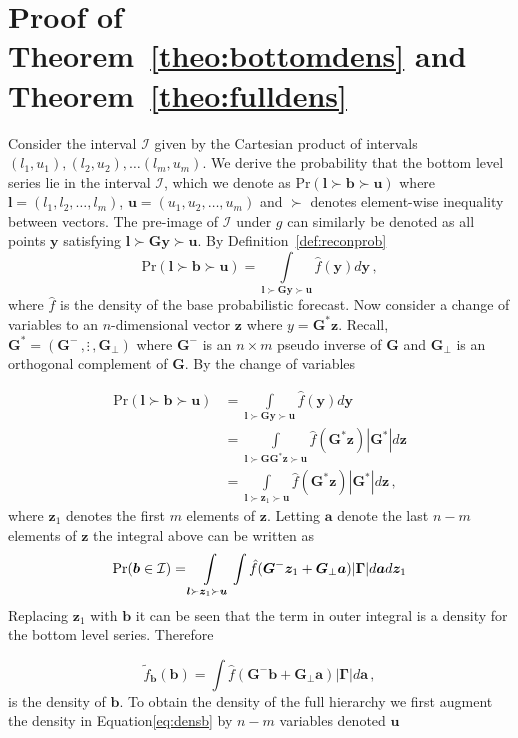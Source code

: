 \documentclass[12pt]{article}
\theoremstyle{definition}
\begin{document}
\newpage

\appendix

\section{Proof of Theorem~\ref{theo:bottomdens} and Theorem~\ref{theo:fulldens}}

Consider the interval $\mathcal{I}$ given by the Cartesian product of intervals $(l_1,u_1),(l_2,u_2),\ldots(l_m,u_m)$.  We derive the probability that the bottom level series lie in the interval $\mathcal{I}$, which we denote as $\mbox{Pr}(\bm{l}\succ\bm{b}\succ\bm{u})$ where ${\bm l}=(l_1,l_2,\ldots,l_m)$, ${\bm u}=(u_1,u_2,\ldots,u_m)$ and $\succ$ denotes element-wise inequality between vectors.  The pre-image of $\mathcal{I}$ under $g$ can similarly be denoted as all points ${\bm y}$ satisfying $\bm{l}\succ\bm{G}\bm{y}\succ\bm{u}$.  By Definition~\ref{def:reconprob} 
\[
\mbox{Pr}(\bm{l}\succ\bm{b}\succ\bm{u})=\int\limits_{\bm{l}\succ\bm{G}\bm{y}\succ\bm{u}}\hat{f}(\bm{y})d{\bm y}\,,
\]
where $\hat{f}$ is the density of the base probabilistic forecast.  Now consider a change of variables to an $n$-dimensional vector ${\bm z}$ where $y={\bm G^*}{\bm z}$. Recall, ${\bm G^*}=\left({\bm G^{-}}\,,\vdots\,,{\bm G_\perp}\right)$ where ${\bm G^{-}}$ is an $n\times m$ pseudo inverse of $\bm{G}$ and ${\bm G_\perp}$ is an orthogonal complement of $\bm{G}$.  By the change of variables

\begin{align}
\mbox{Pr}(\bm{l}\succ\bm{b}\succ\bm{u})&=\int\limits_{\bm{l}\succ\bm{G}\bm{y}\succ\bm{u}}\hat{f}(\bm{y})d{\bm y}\nonumber\\
&=\int\limits_{\bm{l}\succ\bm{G}\bm{G}^*\bm{z}\succ\bm{u}}\hat{f}(\bm{G}^*\bm{z})|\bm{G}^*|d{\bm z}\nonumber\\
&=\int\limits_{\bm{l}\succ\bm{z}_1\succ\bm{u}}\hat{f}(\bm{G}^*\bm{z})|\bm{G}^*|d{\bm z}\nonumber\,,
\end{align}
where $\bm{z}_1$ denotes the first $m$ elements of $\bm z$.  Letting $\bm{a}$ denote the last $n-m$ elements of $\bm{z}$ the integral above can be written as
\[ 
\mbox{Pr}({\bm b}\in \mathcal{I})=\int\limits_{\bm{l}\succ\bm{z}_1\succ\bm{u}}\int\hat{f}(\bm{G}^{-}\bm{z}_1+\bm{G}_{\perp}\bm{a})|\bm{\Gamma}|d{\bm a}d{\bm z}_1\nonumber\\
\]
Replacing ${\bm z}_1$ with ${\bm b}$ it can be seen that the term in outer integral is a density for the bottom level series. Therefore

\begin{equation}
\tilde{f}_{\bm{b}}(\bm{b})=\int\hat{f}(\bm{G}^{-}\bm{b}+\bm{G}_{\perp}\bm{a})|\bm{\Gamma}|d{\bm a}\,,
\label{eq:densb}
\end{equation}
is the density of ${\bm b}$. To obtain the density of the full hierarchy we first augment the density in Equation\ref{eq:densb} by $n-m$ variables denoted $\bm{u}$
\end{document}
